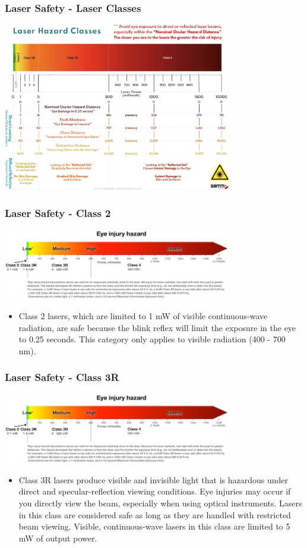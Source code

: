 \documentclass{beamer}
\begin{document}
\begin{frame}\frametitle{Laser Safety - Laser Classes}
\begin{center}
\includegraphics[width=10cm]{fig/lasersafe.jpg}
\end{center}
\end{frame}

\begin{frame}\frametitle{Laser Safety - Class 2}
\begin{center}
\includegraphics[width=10cm]{fig/lsafe.png}
\end{center}
\begin{itemize}
\item Class 2 lasers, which are limited to 1 mW of visible continuous-wave radiation, are safe because the blink reflex will limit the exposure in the eye to 0.25 seconds. This category only applies to visible radiation (400 - 700 nm).
\end{itemize}
\end{frame}

\begin{frame}\frametitle{Laser Safety - Class 3R}
\begin{center}
\includegraphics[width=10cm]{fig/lsafe.png}
\end{center}
\begin{itemize}
\item Class 3R lasers produce visible and invisible light that is hazardous under direct and specular-reflection viewing conditions. Eye injuries may occur if you directly view the beam, especially when using optical instruments. Lasers in this class are considered safe as long as they are handled with restricted beam viewing. Visible, continuous-wave lasers in this class are limited to 5 mW of output power.
\end{itemize}
\end{frame}
\end{document}
